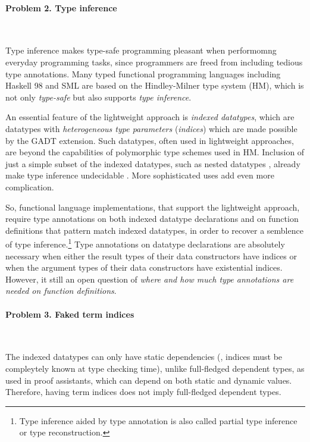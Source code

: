 \paragraph{Problem 2. \textbf{Type inference}} ~

Type inference makes type-safe programming pleasant when performomng
everyday programming tasks, since programmers are freed from including tedious type annotations.
Many typed functional programming languages including Haskell 98 and SML
are based on the Hindley-Milner type system (HM), which is not only
\emph{type-safe} but also supports \emph{type inference}.

An essential feature of the lightweight approach is \emph{indexed datatypes},
which are datatypes with \emph{heterogeneous type parameters}
(\aka \emph{indices}) which are made possible by the GADT extension.
Such datatypes, often used in lightweight approaches, are
beyond the capabilities of polymorphic type schemes used in HM. Inclusion of 
just a simple subset of
the indexed datatypes, such as nested datatypes \cite{BirMee98}, already make
type inference undecidable \cite{Henglein93}. More sophisticated
uses add even more complication\cite{Lin2010}.

So, functional language implementations, that support the lightweight approach,
require type annotations on both indexed datatype declarations and on
function definitions that pattern match indexed datatypes, in order to recover
a semblence of type inference.\footnote{
	Type inference aided by type annotation is also called
	partial type inference or type reconstruction.}
Type annotations on datatype declarations are absolutely necessary
when either the result types of their data constructors have indices
or when the argument types of their data constructors have existential indices.
However, it still an open question of
\emph{where and how much type annotations are needed on function definitions}.

\paragraph{Problem 3. \textbf{Faked term indices}} ~

The indexed datatypes can only have static dependencies (\ie, indices must be compleytely
known at type checking time), unlike full-fledged dependent types, as used in proof assistants,
which can depend on both static and dynamic values. Therefore, having term indices does
not imply full-fledged dependent types.

